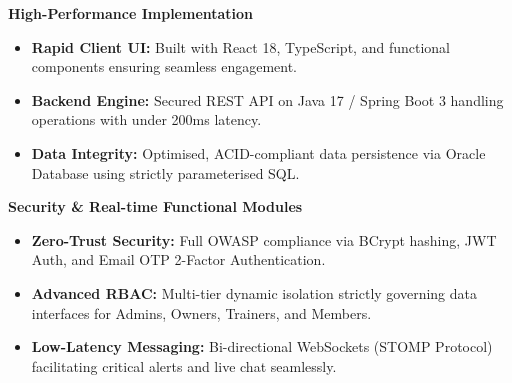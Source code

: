 \documentclass[14pt]{extarticle}
\begin{document}
\begin{tcolorbox}[colframe=itmred, colback=white, boxrule=3pt, arc=0pt, outer arc=0pt, 
                  width=\textwidth, height=\textheight, enlarge top by=-1cm, enlarge bottom by=-1cm]
\begin{minipage}[t]{0.59\textwidth}
    \begin{tcolorbox}[colback=verylightblue, colframe=itmblue, boxrule=0.5pt, arc=2pt, left=4pt, right=4pt, top=3pt, bottom=3pt]
    \textbf{High-Performance Implementation}
    \begin{itemize}
        \item \textbf{Rapid Client UI:} Built with React 18, TypeScript, and functional components ensuring seamless engagement.
        \item \textbf{Backend Engine:} Secured REST API on Java 17 / Spring Boot 3 handling operations with under 200ms latency.
        \item \textbf{Data Integrity:} Optimised, ACID-compliant data persistence via Oracle Database using strictly parameterised SQL.
    \end{itemize}
    \end{tcolorbox}
    
    \vspace{0.05cm}
    
    \begin{tcolorbox}[colback=white, colframe=itmred, boxrule=0.5pt, arc=2pt, left=4pt, right=4pt, top=3pt, bottom=3pt]
    \textbf{Security \& Real-time Functional Modules}
    \begin{itemize}
        \item \textbf{Zero-Trust Security:} Full OWASP compliance via BCrypt hashing, JWT Auth, and Email OTP 2-Factor Authentication.
        \item \textbf{Advanced RBAC:} Multi-tier dynamic isolation strictly governing data interfaces for Admins, Owners, Trainers, and Members.
        \item \textbf{Low-Latency Messaging:} Bi-directional WebSockets (STOMP Protocol) facilitating critical alerts and live chat seamlessly.
    \end{itemize}
    \end{tcolorbox}
\end{minipage}

\vspace{0.15cm}



\end{tcolorbox}
\end{document}
